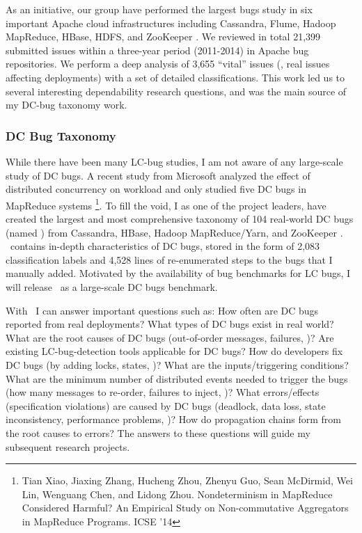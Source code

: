 \documentclass[11pt]{article}
\begin{document}
As an initiative, our group have performed the largest bugs study in six
important Apache cloud infrastructures including Cassandra, Flume, Hadoop
MapReduce, HBase, HDFS, and ZooKeeper \cite{Gunawi+14-Cbs}. We reviewed in
total 21,399 submitted issues within a three-year period (2011-2014) in Apache
bug repositories. We perform a deep analysis of 3,655 ``vital'' issues (\ie,
real issues affecting deployments) with a set of detailed classifications. This
work led us to several interesting dependability research questions, and was
the main source of my DC-bug taxonomy work.

\subsubsection{DC Bug Taxonomy} 

While there have been many LC-bug studies, I am not aware of any large-scale
study of DC bugs. A recent study from Microsoft analyzed the effect of
distributed concurrency on workload and only studied five DC bugs in MapReduce
systems \footnote{Tian Xiao, Jiaxing Zhang, Hucheng Zhou, Zhenyu Guo, Sean
McDirmid, Wei Lin, Wenguang Chen, and Lidong Zhou. Nondeterminism in MapReduce
Considered Harmful?  An Empirical Study on Non-commutative Aggregators in
MapReduce Programs. ICSE '14}. To fill the void, I as one of the project
leaders, have created the largest and most comprehensive taxonomy of 104
real-world DC bugs (named \taxdc) from Cassandra, HBase, Hadoop MapReduce/Yarn,
and ZooKeeper \cite{Gunawi+16-TaxDc-Appear}. \taxdc\ contains in-depth
characteristics of DC bugs, stored in the form of 2,083 classification labels
and 4,528 lines of re-enumerated steps to the bugs that I manually added.
Motivated by the availability of bug benchmarks for LC bugs, I will release
\taxdc\ as a large-scale DC bugs benchmark.

With \taxdc\, I can answer important questions such as: How often are DC bugs 
reported from real deployments? What types of DC bugs exist in real world?
What are the root causes of DC bugs (out-of-order messages, failures, \etc)?
Are existing LC-bug-detection tools applicable for DC bugs? How do developers
fix DC bugs (by adding locks, states, \etc)? What are the inputs/triggering
conditions?  What are the minimum number of distributed events needed to
trigger the bugs (how many messages to re-order, failures to inject, \etc)?
What errors/effects (specification violations) are caused by DC bugs (deadlock,
data loss, state inconsistency, performance problems, \etc)? How do propagation
chains form from the root causes to errors? The answers to these questions will
guide my subsequent research projects.
\end{document}
